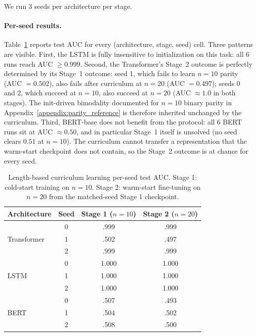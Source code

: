 \documentclass{article}
\theoremstyle{plain}
\theoremstyle{definition}
\theoremstyle{remark}
\begin{document}
We run 3 seeds per architecture per stage.

\paragraph{Per-seed results.} Table~\ref{tab:curriculum-per-seed} reports test AUC for every (architecture, stage, seed) cell. Three patterns are visible. First, the LSTM is fully insensitive to initialization on this task: all 6 runs reach AUC $\geq 0.999$. Second, the Transformer's Stage~2 outcome is perfectly determined by its Stage~1 outcome: seed 1, which fails to learn $n=10$ parity (AUC $=0.502$), also fails after curriculum at $n=20$ (AUC $=0.497$); seeds 0 and 2, which succeed at $n=10$, also succeed at $n=20$ (AUC $\approx 1.0$ in both stages). The init-driven bimodality documented for $n=10$ binary parity in Appendix~\ref{appendix:parity_reference} is therefore inherited unchanged by the curriculum. Third, BERT-base does not benefit from the protocol: all 6 BERT runs sit at AUC $\approx 0.50$, and in particular Stage~1 itself is unsolved (no seed clears $0.51$ at $n=10$). The curriculum cannot transfer a representation that the warm-start checkpoint does not contain, so the Stage~2 outcome is at chance for every seed.

\begin{table}[h]
\caption{Length-based curriculum learning per-seed test AUC. Stage 1: cold-start training on $n=10$. Stage 2: warm-start fine-tuning on $n=20$ from the matched-seed Stage 1 checkpoint.}
\label{tab:curriculum-per-seed}
\centering
\begin{tabular}{lccc}
\toprule
Architecture & Seed & Stage 1 ($n{=}10$) & Stage 2 ($n{=}20$) \\
\midrule
\multirow{3}{*}{Transformer} & 0 & .999 & .999 \\
 & 1 & .502 & .497 \\
 & 2 & .999 & .999 \\
\midrule
\multirow{3}{*}{LSTM} & 0 & 1.000 & 1.000 \\
 & 1 & 1.000 & 1.000 \\
 & 2 & 1.000 & 1.000 \\
\midrule
\multirow{3}{*}{BERT} & 0 & .507 & .493 \\
 & 1 & .504 & .502 \\
 & 2 & .508 & .500 \\
\bottomrule
\end{tabular}
\end{table}
\end{document}
